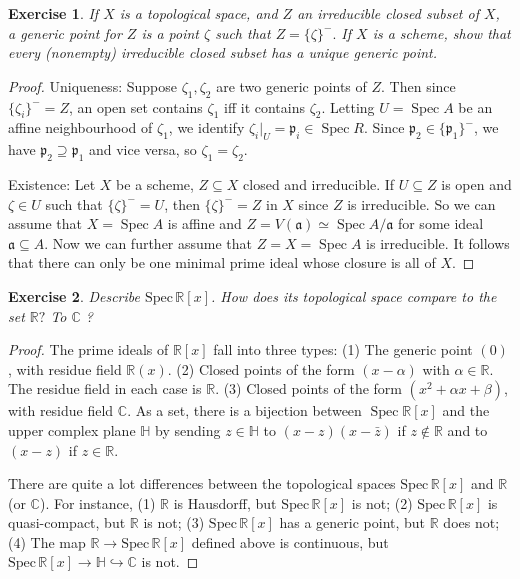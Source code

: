\documentclass{amsart}
\newtheorem{exe}{Exercise}[subsection]
\theoremstyle{remark}\newtheorem{rmk}[theorem]{Remark}
\begin{document}
\begin{exe}
If $X$ is a topological space, and $Z$ an irreducible closed subset of $X$, a generic point for $Z$ is a point $\zeta$ such that $Z=\{\zeta\}^{-} .$ If $X$ is a scheme, show that every (nonempty) irreducible closed subset has a unique generic point.
\end{exe}
\begin{proof}
Uniqueness: Suppose $\zeta_{1}, \zeta_{2}$ are two generic points of $Z$. Then since $\{\zeta_{i}\}^-=Z$, an open set contains $\zeta_{1}$ iff it contains $\zeta_{2}$. Letting $U=\operatorname{Spec} A$ be an affine neighbourhood of $\zeta_{1}$, we identify $\zeta_{i}|_U=\mathfrak{p}_{i} \in \operatorname{Spec} R$. Since $\mathfrak{p}_{2} \in \{\mathfrak{p}_{1}\}^-$, we have $\mathfrak{p}_{2} \supseteq \mathfrak{p}_{1}$ and vice versa, so $\zeta_{1}=\zeta_{2}$.

Existence: Let $X$ be a scheme, $Z \subseteq X$ closed and irreducible. If $U \subseteq Z$ is open and $\zeta \in U$ such that $\{\zeta\}^-=U$, then $\{\zeta\}^-=Z$ in $X$ since $Z$ is irreducible. So we can assume that $X=\operatorname{Spec} A$ is affine and $Z=V(\mathfrak{a})\simeq\operatorname{Spec} A / \mathfrak{a}$ for some ideal $\mathfrak{a} \subseteq A .$ Now we can further assume that $Z=X=\operatorname{Spec} A$ is irreducible. It follows that there can only be one minimal prime ideal whose closure is all of $X$.
\end{proof}

\begin{exe}
Describe $\mathrm{Spec}\, \mathbb{R}[x]$. How does its topological space compare to the set $\mathbb{R} ?$ To $\mathbb{C}$ ?
\end{exe}

\begin{proof}
The prime ideals of $\mathbb{R}[x]$ fall into three types:
(1) The generic point $(0)$, with residue field $\mathbb{R}(x)$.
(2) Closed points of the form $(x-\alpha)$ with $\alpha \in \mathbb{R}$. The residue field in each case is $\mathbb{R}$.
(3) Closed points of the form $\left(x^{2}+\alpha x+\beta\right)$, with residue field $\mathbb{C}$.
As a set, there is a bijection between $\operatorname{Spec} \mathbb{R}[x]$ and the upper complex plane $\mathbb{H}$ by sending $z \in \mathbb{H}$ to $(x-z)(x-\bar{z})$ if $z \notin \mathbb{R}$ and
to $(x-z)$ if $z \in \mathbb{R}$.

There are quite a lot differences between the topological spaces $\mathrm{Spec}\,\mathbb{R}[x]$ and $\mathbb{R}$ (or $\mathbb{C}$). For instance, (1) $\mathbb{R}$ is Hausdorff, but $\mathrm{Spec}\,\mathbb{R}[x]$ is not; (2) $\mathrm{Spec}\,\mathbb{R}[x]$ is quasi-compact, but $\mathbb{R}$ is not; (3) $\mathrm{Spec}\,\mathbb{R}[x]$ has a generic point, but $\mathbb{R}$ does not;
(4) The map $\mathbb{R}\to\mathrm{Spec}\,\mathbb{R}[x]$ defined above is continuous, but $\mathrm{Spec}\,\mathbb{R}[x]\to\mathbb{H}\hookrightarrow\mathbb{C}$ is not.
\end{proof}
\end{document}
